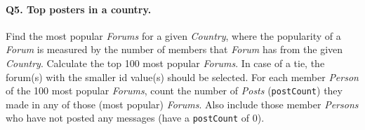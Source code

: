 \paragraph{\textbf{Q5}. Top posters in a country.}
Find the most popular \emph{Forums} for a given \emph{Country}, where
the popularity of a \emph{Forum} is measured by the number of members
that \emph{Forum} has from the given \emph{Country}.
Calculate the top 100 most popular \emph{Forums}. In case of a tie, the
forum(s) with the smaller id value(s) should be selected.
For each member \emph{Person} of the 100 most popular \emph{Forums},
count the number of \emph{Posts} (\texttt{postCount}) they made in any
of those (most popular) \emph{Forums}. Also include those member
\emph{Persons} who have not posted any messages (have a
\texttt{postCount} of 0).
